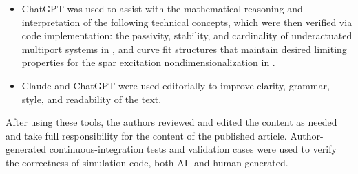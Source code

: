 \documentclass[a4paper,fleqn,colorlinks,unicode,hypertexnames=false]{cas-dc}
\begin{document}
\begin{itemize}[leftmargin=*]
the circle/ellipse intersection formulas in ;
the sensitivity formulas for the \gls{acr-pto} limit in ;
the curvature of the function in ;
the trigonometric simplifications in the slamming angle formula in .
\item ChatGPT was used to assist with the mathematical reasoning and interpretation of the following technical concepts, which were then verified via code implementation: the passivity, stability, and cardinality of underactuated multiport systems in , and curve fit structures that maintain desired limiting properties for the spar excitation nondimensionalization in .
\item Claude and ChatGPT were used editorially to improve clarity, grammar, style, and readability of the text.
\end{itemize}
After using these tools, the authors reviewed and edited the content as needed and take full responsibility for the content of the published article.
Author-generated continuous-integration tests and validation cases were used to verify the correctness of simulation code, both AI- and human-generated.


\appendix
\singleColMacro{

}
\printcredits



\end{document}
